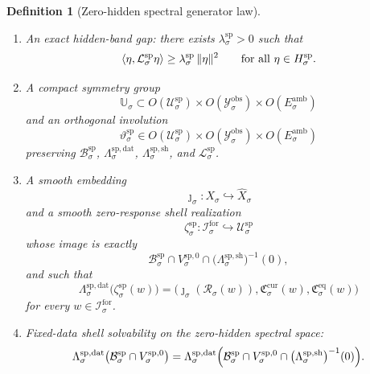 \documentclass[11pt]{article}
\newcommand{\ForSpace}[1]{\mathcal I_{#1}^{\mathrm{for}}}
\newcommand{\Reduction}[1]{\mathcal R_{#1}}
\newcommand{\CurrentCarrier}[1]{\mathfrak C_{#1}^{\mathrm{cur}}}
\newcommand{\EqCarrier}[1]{\mathfrak C_{#1}^{\mathrm{eq}}}
\newcommand{\VisibleAffine}[1]{\widehat X_{#1}}
\newcommand{\DataSpace}[1]{\mathcal Y_{#1}^{\mathrm{obs}}}
\newcommand{\AmbientTarget}[1]{E_{#1}^{\mathrm{amb}}}
\newcommand{\SpecSpace}[1]{\mathcal U_{#1}^{\mathrm{sp}}}
\newcommand{\SpecBody}[1]{\mathcal B_{#1}^{\mathrm{sp}}}
\newcommand{\SpecData}[1]{\Lambda_{#1}^{\mathrm{sp,dat}}}
\newcommand{\SpecShell}[1]{\Lambda_{#1}^{\mathrm{sp,sh}}}
\newcommand{\SpecOp}[1]{\mathcal L_{#1}^{\mathrm{sp}}}
\newcommand{\SpecZero}[1]{V_{#1}^{\mathrm{sp},0}}
\newcommand{\SpecHidden}[1]{H_{#1}^{\mathrm{sp}}}
\newcommand{\SpecHiddenBody}[1]{D_{#1}^{\mathrm{sp}}}
\newcommand{\SpecSym}[1]{\mathbb U_{#1}}
\newcommand{\SpecTime}[1]{\vartheta_{#1}^{\mathrm{sp}}}
\newcommand{\SpecEmbed}[1]{\zeta_{#1}^{\mathrm{sp}}}
\newtheorem{definition}{Definition}
\begin{document}
\begin{definition}[Zero-hidden spectral generator law]
\begin{enumerate}
\[    0\in\operatorname{int}\SpecHiddenBody{\sigma},
    \]
    such that the spectral state body splits exactly as
    \begin{equation}
    \SpecBody{\sigma}
    =
    \left\{
    z+\eta:
    z\in\SpecBody{\sigma}\cap\SpecZero{\sigma},
    \quad
    \eta\in\SpecHiddenBody{\sigma}
    \right\}.
    \label{eq:specsplitting}
    \end{equation}
    \item An exact hidden-band gap: there exists \(\lambda_{\sigma}^{\mathrm{sp}}>0\) such that
    \begin{equation}
    \ev{\eta,\SpecOp{\sigma}\eta}
    \ge
    \lambda_{\sigma}^{\mathrm{sp}}\,
    \|\eta\|^{2}
    \qquad
    \text{for all }\eta\in\SpecHidden{\sigma}.
    \label{eq:specgap}
    \end{equation}
    \item A compact symmetry group
    \[
    \SpecSym{\sigma}\subset
    O(\SpecSpace{\sigma})\times
    O(\DataSpace{\sigma})\times
    O(\AmbientTarget{\sigma})
    \]
    and an orthogonal involution
    \[
    \SpecTime{\sigma}\in
    O(\SpecSpace{\sigma})\times
    O(\DataSpace{\sigma})\times
    O(\AmbientTarget{\sigma})
    \]
    preserving \(\SpecBody{\sigma}\), \(\SpecData{\sigma}\), \(\SpecShell{\sigma}\), and \(\SpecOp{\sigma}\).
    \item A smooth embedding
    \[
    \jmath_{\sigma}:X_{\sigma}\hookrightarrow\VisibleAffine{\sigma}
    \]
    and a smooth zero-response shell realization
    \[
    \SpecEmbed{\sigma}:\ForSpace{\sigma}\hookrightarrow\SpecSpace{\sigma}
    \]
    whose image is exactly
    \[
    \SpecBody{\sigma}\cap
    \SpecZero{\sigma}\cap
    \bigl(\SpecShell{\sigma}\bigr)^{-1}(0),
    \]
    and such that
    \begin{equation}
    \SpecData{\sigma}\bigl(\SpecEmbed{\sigma}(w)\bigr)
    =
    \bigl(
    \jmath_{\sigma}(\Reduction{\sigma}(w)),
    \CurrentCarrier{\sigma}(w),
    \EqCarrier{\sigma}(w)
    \bigr)
    \label{eq:speccompat}
    \end{equation}
    for every \(w\in\ForSpace{\sigma}\).
    \item Fixed-data shell solvability on the zero-hidden spectral space:
    \begin{equation}
    \SpecData{\sigma}\bigl(
    \SpecBody{\sigma}\cap\SpecZero{\sigma}
    \bigr)
    =
    \SpecData{\sigma}\Bigl(
    \SpecBody{\sigma}\cap
    \SpecZero{\sigma}\cap
    \bigl(\SpecShell{\sigma}\bigr)^{-1}(0)
    \Bigr).
    \label{eq:specsolvability}
    \end{equation}

\end{enumerate}
\end{definition}
\end{document}
